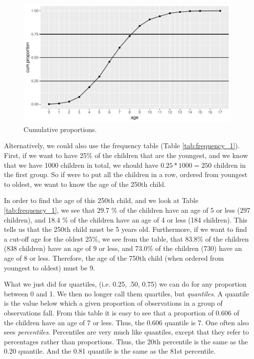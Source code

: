 \documentclass[]{report}\usepackage[]{graphicx}\usepackage[]{color}
\makeatletter
\def\maxwidth{ %
  \ifdim\Gin@nat@width>\linewidth
    \linewidth
  \else
    \Gin@nat@width
  \fi
}
\makeatother
\begin{document}
\begin{figure}

{\centering \includegraphics[width=\maxwidth]{figure/quartile_2-1} 

}

\caption[Cumulative proportions]{Cumulative proportions.}\label{fig:quartile_2}
\end{figure}




Alternatively, we could also use the frequency table (Table \ref{tab:frequency_1}). First, if we want to have 25\% of the children that are the youngest, and we know that we have 1000 children in total, we should have $0.25 * 1000=250$ children in the first group. So if were to put all the children in a row, ordered from youngest to oldest, we want to know the age of the 250th child.

In order to find the age of this 250th child, and we look at Table \ref{tab:frequency_1}, we see that 29.7 \% of the children have an age of 5 or less (297 children), and 18.4 \% of the children have an age of 4 or less (184 children). This tells us that the 250th child must be 5 years old. Furthermore, if we want to find a cut-off age for the oldest 25\%, we see from the table, that 83.8\% of the children (838 children) have an age of 9 or less, and 73.0\% of the children (730) have an age of 8 or less. Therefore, the age of the 750th child (when ordered from youngest to oldest) must be 9.


What we just did for quartiles, (i.e. 0.25, .50, 0.75) we can do for any proportion between 0 and 1. We then no longer call them quartiles, but \textit{quantiles}. A quantile is the value below which a given proportion of observations in a group of observations fall. From this table it is easy to see that a proportion of 0.606 of the children have an age of 7 or less. Thus, the 0.606 quantile is 7. One often also sees \textit{percentiles}. Percentiles are very much like quantiles, except that they refer to percentages rather than proportions. Thus, the 20th percentile is the same as the 0.20 quantile. And the 0.81 quantile is the same as the 81st percentile.
\end{document}
